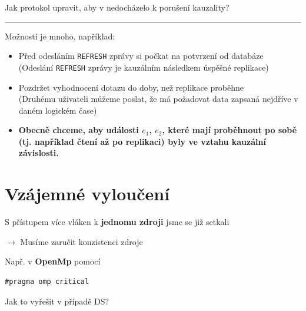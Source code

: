 \documentclass[usenames,dvipsnames,9pt]{beamer}
\begin{document}
\begin{frame}
  \begin{center}
    \LARGE Jak protokol upravit, aby v nedocházelo k porušení kauzality?
  \end{center}

  \pause\vspace{1em}\hrule\vspace{1em}
  Možností je mnoho, například:
  \begin{itemize}
    \pause\item Před odesláním \texttt{REFRESH} zprávy si počkat na potvrzení od databáze \\
                {\small (Odeslání \texttt{REFRESH} zprávy je kauzálním následkem úspěšné replikace)}
    \pause\item Pozdržet vyhodnocení dotazu do doby, než replikace proběhne \\
                {\small (Druhému uživateli můžeme poslat, že má požadovat data zapsaná nejdříve v daném logickém čase)}
  \end{itemize}
  \pause
  \begin{itemize}
    \item[\faWarning] \bf Obecně chceme, aby události $e_1$, $e_2$, které mají proběhnout po sobě (tj. například čtení až po replikaci) byly ve vztahu kauzální závislosti.
  \end{itemize}
\end{frame}


\section{Vzájemné vyloučení}

\begin{frame}[fragile]

S přístupem více vláken k {\bf jednomu zdroji} jsme se již setkali

\hfill $\rightarrow$ Musíme zaručit konzistenci zdroje

\vspace{1em}

\begin{minipage}{0.4\linewidth}
Např. v {\bf OpenMp} pomocí
\end{minipage}
\begin{minipage}{0.4\linewidth}
\begin{verbatim}
#pragma omp critical
\end{verbatim}
\end{minipage}

 \vspace{2em}\pause

  \begin{center}
    \LARGE Jak to vyřešit v případě DS?
  \end{center}


\end{frame}
\end{document}
